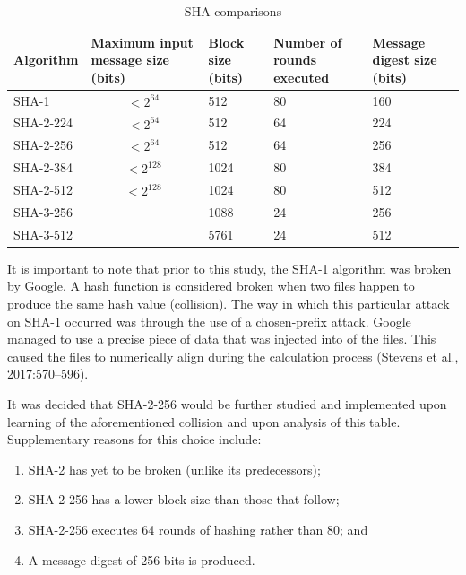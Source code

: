     
    \begin{table}[h!]
    \caption{SHA comparisons}
    \centering
     \begin{tabular}{|p{} | p{}| p{}| p{}| p{}|} 
     \hline
    	\textbf{Algorithm} & \textbf{Maximum input message size (bits)} & \textbf{Block size (bits)} & \textbf{Number of rounds executed} & \textbf{Message digest size (bits)} \\ [1ex] 
     \hline\hline 
     \centering
     SHA-1 & \[ <2^{64}\] & 512 & 80 & 160 \\[1ex]
     \hline 
     \centering
     SHA-2-224 & \[ <2^{64}\] & 512 & 64 & 224 \\[1ex]
     \hline
     SHA-2-256 & \[ <2^{64}\] & 512 & 64 & 256 \\[1ex]
     \hline           
     SHA-2-384 & \[ <2^{128}\] & 1024 & 80 & 384 \\[1ex]
     \hline      
     SHA-2-512 & \[ <2^{128}\] & 1024 & 80 & 512 \\[1ex]
     \hline
     SHA-3-256 & \centering{Unlimited} & 1088 & 24 & 256 \\[1ex] 
     \hline
     SHA-3-512 & \centering{Unlimited} & 5761 & 24 & 512 \\[1ex]
     \hline
     \end{tabular}
    \end{table}
    
    It is important to note that prior to this study, the SHA-1 algorithm was broken by Google. A hash function is considered broken when two files happen to produce the same hash value (collision). The way in which this particular attack on SHA-1 occurred was through the use of a chosen-prefix attack. Google managed to use a precise piece of data that was injected into of the files. This caused the files to numerically align during the calculation process (Stevens et al., 2017:570–596).
    
    It was decided that SHA-2-256 would be further studied and implemented upon learning of the aforementioned collision and upon analysis of this table. Supplementary reasons for this choice include:
    
        \begin{enumerate}[label=\roman*.]
            
            \item SHA-2 has yet to be broken (unlike its predecessors);
            \item SHA-2-256 has a lower block size than those that follow; \item SHA-2-256 executes 64 rounds of hashing rather than 80; and
            \item A message digest of 256 bits is produced.

        \end{enumerate}
    
